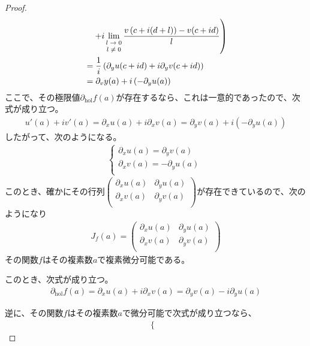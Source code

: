 \documentclass[dvipdfmx]{jsarticle}
\begin{document}
\begin{proof}
\begin{align*}
&\quad \left. + i\lim_{\scriptsize \begin{matrix}
l \rightarrow 0 \\
l \neq 0 \\
\end{matrix}}\frac{v\left( c + i(d + l) \right) - v(c + id)}{l} \right)\\
&= \frac{1}{i}\left( \partial_{y}u(c + id) + i\partial_{y}v(c + id) \right)\\
&= \partial_{v}y(a) + i\left( - \partial_{y}u(a) \right)
\end{align*}
ここで、その極限値$\partial_{\mathrm{hol}}f(a)$が存在するなら、これは一意的であったので、次式が成り立つ。
\begin{align*}
u'(a) + iv'(a) = \partial_{x}u(a) + i\partial_{x}v(a) = \partial_{y}v(a) + i\left( - \partial_{y}u(a) \right)
\end{align*}
したがって、次のようになる。
\begin{align*}
\left\{ \begin{matrix}
\partial_{x}u(a) = \partial_{y}v(a) \\
\partial_{x}v(a) = - \partial_{y}u(a) \\
\end{matrix} \right.\ 
\end{align*}
このとき、確かにその行列$\begin{pmatrix}
\partial_{x}u(a) & \partial_{y}u(a) \\
\partial_{x}v(a) & \partial_{y}v(a) \\
\end{pmatrix}$が存在できているので、次のようになり
\begin{align*}
J_{f}(a) = \begin{pmatrix}
\partial_{x}u(a) & \partial_{y}u(a) \\
\partial_{x}v(a) & \partial_{y}v(a) \\
\end{pmatrix}
\end{align*}
その関数$f$はその複素数$a$で複素微分可能である。\par
このとき、次式が成り立つ。
\begin{align*}
\partial_{\mathrm{hol}}f(a) = \partial_{x}u(a) + i\partial_{x}v(a) = \partial_{y}v(a) - i\partial_{y}u(a)
\end{align*}\par
逆に、その関数$f$はその複素数$a$で微分可能で次式が成り立つなら、
\begin{align*}
\left\{ \begin{matrix}

\end{matrix}
\end{align*}
\end{proof}
\end{document}
